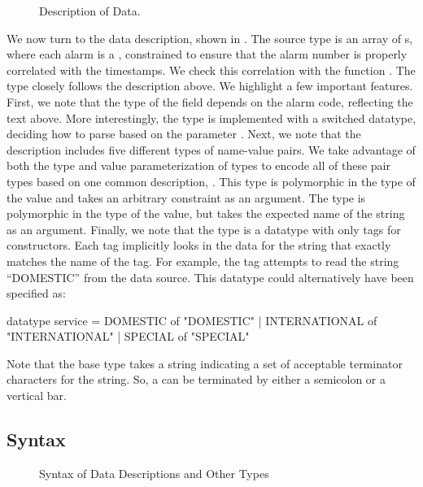 \documentclass{entcs}
\begin{document}
\begin{figure}
  \centering
  \small
  
  \caption{Description of \darkstar{} Data.}
  \label{fig:darkstar-ml}
\end{figure}
We now turn to the data description, shown in .
The source type is an array of s, where each alarm is a
, constrained to ensure that the alarm number is
properly correlated with the timestamps.  We check this correlation
with the function .  The type  closely
follows the description above. We highlight a few important features.
First, we note that the type of the field  depends on the
alarm code, reflecting the text above. More interestingly, the type
 is implemented with a switched datatype, deciding how to
parse based on the parameter .  Next, we note that the
description includes five different types of name-value pairs. We take
advantage of both the type and value parameterization of types to
encode all of these pair types based on one common description,
. This type is polymorphic in the type of the value and takes
an arbitrary constraint  as an argument. The type  is
polymorphic in the type of the value, but takes the expected name of
the string as an argument. Finally, we note that the type 
is a datatype with only tags for constructors.  Each tag implicitly
looks in the data for the string that exactly matches the name of the
tag. For example, the tag  attempts to read the string
``DOMESTIC'' from the data source. This datatype could alternatively
have been specified as:
\begin{code}
datatype service =
    DOMESTIC      of "DOMESTIC"
  | INTERNATIONAL of "INTERNATIONAL"
  | SPECIAL       of "SPECIAL"
\end{code}

Note that the base type  takes a string indicating a set
of acceptable terminator characters for the string. So, a
 can be terminated by either a semicolon or a
vertical bar.

\subsection{Syntax}

\begin{figure}
  \centering
  
  \caption{Syntax of Data Descriptions and Other Types}
  \label{fig:syntax-dd}
\end{figure}
\end{document}
